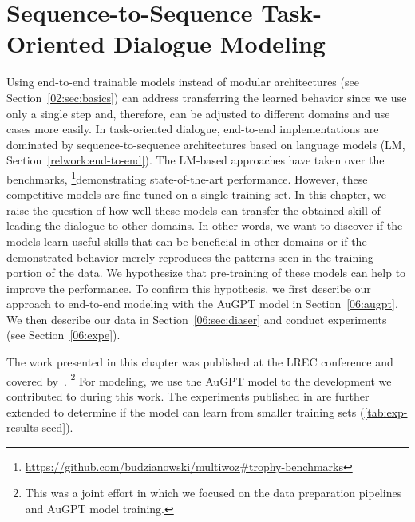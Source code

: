 \chapter{Sequence-to-Sequence Task-Oriented Dialogue Modeling}
\label{06:chap:lm-tod}
Using end-to-end trainable models instead of modular architectures (see Section~\ref{02:sec:basics}) can address transferring the learned behavior since we use only a single step and, therefore, can be adjusted to different domains and use cases more easily.
In task-oriented dialogue, end-to-end implementations are dominated by sequence-to-sequence architectures based on language models (LM, Section~\ref{relwork:end-to-end}).
The LM-based approaches have taken over the benchmarks, \footnote{\url{https://github.com/budzianowski/multiwoz\#trophy-benchmarks}}demonstrating state-of-the-art performance.
However, these competitive models are fine-tuned on a single training set.
In this chapter, we raise the question of how well these models can transfer the obtained skill of leading the dialogue to other domains.
In other words, we want to discover if the models learn useful skills that can be beneficial in other domains or if the demonstrated behavior merely reproduces the patterns seen in the training portion of the data.
We hypothesize that pre-training of these models can help to improve the performance.
To confirm this hypothesis, we first describe our approach to end-to-end modeling with the AuGPT model \cite{kulhanek-etal-2021-augpt} in Section~\ref{06:augpt}.
We then describe our data in Section~\ref{06:sec:diaser} and conduct experiments (see Section~\ref{06:expe}).

The work presented in this chapter was published at the LREC conference and covered by~\citet{hudecek-etal-2022-unifying}.
\footnote{This was a joint effort in which we focused on the data preparation pipelines and AuGPT model training.}
For modeling, we use the AuGPT model \cite{kulhanek-etal-2021-augpt} to the development we contributed to during this work.
The experiments published in \citet{hudecek-etal-2022-unifying} are further extended to determine if the model can learn from smaller training sets (\ref{tab:exp-results-seed}).


